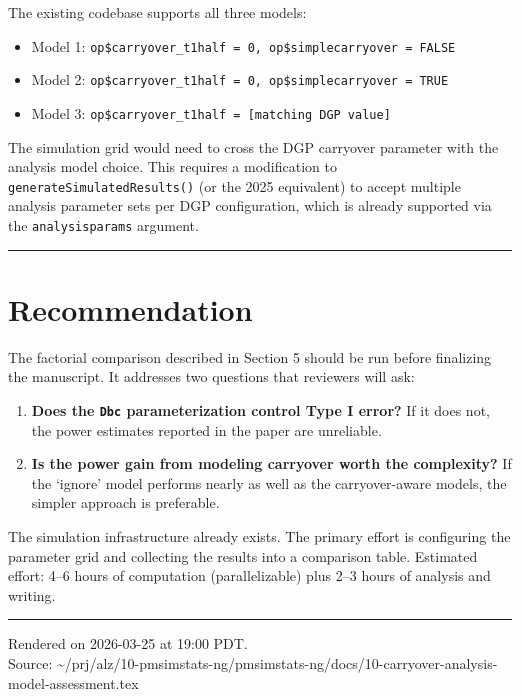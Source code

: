 \documentclass[11pt]{article}
\begin{document}
The existing codebase supports all three models:

\begin{itemize}
  \item Model 1: \texttt{op\$carryover\_t1half = 0, op\$simplecarryover = FALSE}
  \item Model 2: \texttt{op\$carryover\_t1half = 0, op\$simplecarryover = TRUE}
  \item Model 3: \texttt{op\$carryover\_t1half = [matching DGP value]}
\end{itemize}

The simulation grid would need to cross the DGP carryover
parameter with the analysis model choice. This requires a
modification to \texttt{generateSimulatedResults()} (or the 2025
equivalent) to accept multiple analysis parameter sets per
DGP configuration, which is already supported via the
\texttt{analysisparams} argument.

\bigskip\noindent\rule{\textwidth}{0.4pt}\bigskip

\section{Recommendation}

The factorial comparison described in Section 5 should be run
before finalizing the manuscript. It addresses two questions that
reviewers will ask:

\begin{enumerate}
  \item \textbf{Does the \texttt{Dbc} parameterization control Type I error?} If
    it does not, the power estimates reported in the paper are
    unreliable.

  \item \textbf{Is the power gain from modeling carryover worth the
    complexity?} If the `ignore' model performs nearly as well as
    the carryover-aware models, the simpler approach is
    preferable.
\end{enumerate}

The simulation infrastructure already exists. The primary effort
is configuring the parameter grid and collecting the results into
a comparison table. Estimated effort: 4--6 hours of computation
(parallelizable) plus 2--3 hours of analysis and writing.

\vfill
\noindent\rule{\textwidth}{0.4pt}
{\footnotesize
Rendered on 2026-03-25 at 19:00 PDT.\\
Source: \textasciitilde/prj/alz/10-pmsimstats-ng/pmsimstats-ng/docs/10-carryover-analysis-model-assessment.tex}
\end{document}
